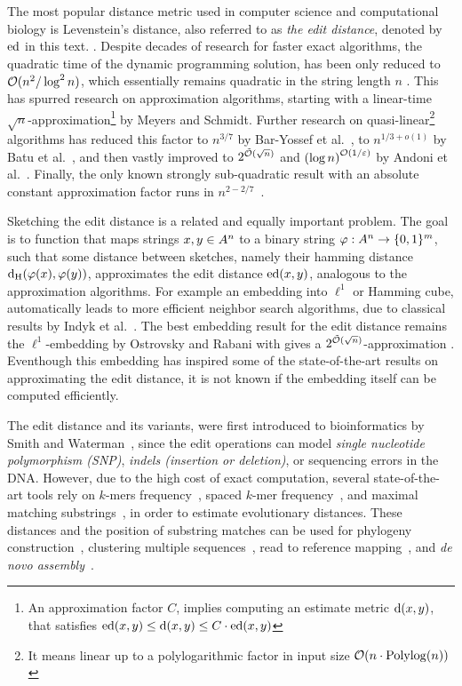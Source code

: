 
The most popular distance metric used in computer science and computational biology is Levenstein's distance, also referred to as \emph{the edit distance}, denoted by $\operatorname{\mathrm{ed}}$ in this text. \cite{Levenshtein1966BinaryReversals}. Despite decades of research for faster exact algorithms, the quadratic time of the dynamic programming solution\cite{Vintsyuk1968SpeechProgramming}, has been only reduced to $\mathcal{O}(n^2/\log^2 n)$, which essentially remains quadratic in the string length $n$ \cite{Masek1980ADistances}. This has spurred research on approximation algorithms, starting with a linear-time $\sqrt{n}$-approximation\footnote{An approximation factor $C$, implies computing an estimate metric $\operatorname{\mathrm{d}}(x,y)$, that satisfies ${\operatorname{\mathrm{ed}}(x,y)\le \operatorname{\mathrm{d}}(x,y)\le C \cdot \operatorname{\mathrm{ed}}(x,y)}$} by Meyers and Schmidt\cite{Landau1998IncrementalComparison}. Further research on quasi-linear\footnote{It means linear up to a polylogarithmic factor in input size $\mathcal{O}(n\cdot \mathrm{Polylog}(n))$} algorithms has reduced this factor to $n^{3/7}$ by Bar-Yossef et al.~\cite{Bar-Yossef2004ApproximatingEfficiently}, to $n^{1/3+o(1)}$ by Batu et al.~\cite{batu2006oblivious}, and then vastly improved to $2^{\tilde{\mathcal{O}}(\sqrt{n})}$ and ${(\log n)}^{\mathcal{O}(1/\varepsilon)}$ by Andoni et al.~\cite{Andoni2012ApproximatingTime,Andoni2010PolylogarithmicComplexity}.  Finally, the only known strongly sub-quadratic result with an absolute constant approximation factor runs in $n^{2-2/7}$~\cite{Time2018ApproximatingTime}. 

Sketching the edit distance is a related and equally important problem. The goal is to  function that maps strings $x,y\in A^n$ to a binary string $\varphi: A^n\to \{0,1\}^m$, such that some distance between sketches, namely their hamming distance $\operatorname{\mathrm{d_{H}}}(\varphi(x),\varphi(y))$, approximates the edit distance $\operatorname{\mathrm{ed}}(x,y)$, analogous to the approximation algorithms. For example an embedding into $\ell^1$ or Hamming cube, automatically leads to more efficient neighbor search algorithms, due to classical results by Indyk et al.~\cite{Indyk1998ApproximateNeighbors}. The best embedding result for the edit distance remains the $\ell^1$-embedding by Ostrovsky and Rabani with gives a $2^{\tilde{\mathcal{O}}(\sqrt{n})}$-approximation . Eventhough this embedding has inspired some of the state-of-the-art results on approximating the edit distance, it is not known if the embedding itself can be computed efficiently. 


The edit distance and its variants, were first introduced to bioinformatics by Smith and Waterman~\cite{Smith1981IdentificationSubsequences}, since the edit operations can model \emph{single nucleotide polymorphism (SNP)}, \emph{indels (insertion or deletion)}, or sequencing errors in the DNA. However, due to the high cost of exact computation, several state-of-the-art tools rely on $k$-mers frequency~\cite{mapleson2016kat}, spaced $k$-mer frequency~\cite{morgenstern2019sequence}, and maximal matching substrings~\cite{thankachan2017greedy}, in order to estimate evolutionary distances. These distances and the position of substring matches can be used for phylogeny construction~\cite{thankachan2017greedy}, clustering multiple sequences~\cite{ondov2016mash}, read to reference mapping~\cite{chakraborty2019s}, and \emph{de novo assembly}~\cite{li2016minimap}. 


